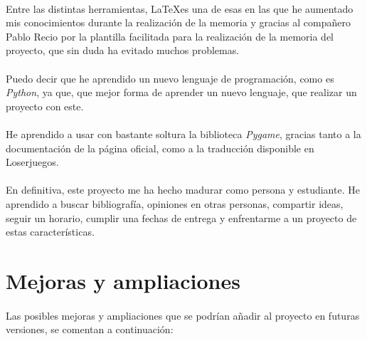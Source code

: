 \documentclass[a4paper,11pt]{article} %
\begin{document}
\paragraph{}
Entre las distintas herramientas, \LaTeX es una de esas en las que he aumentado mis conocimientos durante la realización de la 
memoria y gracias al compañero Pablo Recio por la plantilla facilitada para la realización de la memoria del proyecto, que sin duda
ha evitado muchos problemas.

\paragraph{}
Puedo decir que he aprendido un nuevo lenguaje de programación, como es \emph{Python}, ya que, que mejor forma de aprender un 
nuevo lenguaje, que realizar un proyecto con este.

\paragraph{}
He aprendido a usar con bastante soltura la biblioteca \emph{Pygame}, gracias tanto a la documentación de la página oficial, como
a la traducción disponible en Loserjuegos.

\paragraph{}
En definitiva, este proyecto me ha hecho madurar como persona y estudiante. He aprendido a buscar bibliografía, opiniones en otras
personas, compartir ideas, seguir un horario, cumplir una fechas de entrega y enfrentarme a un proyecto de estas características.


\section{Mejoras y ampliaciones}

\paragraph{}
Las posibles mejoras y ampliaciones que se podrían añadir al proyecto en futuras versiones, se comentan a continuación:
\end{document}
